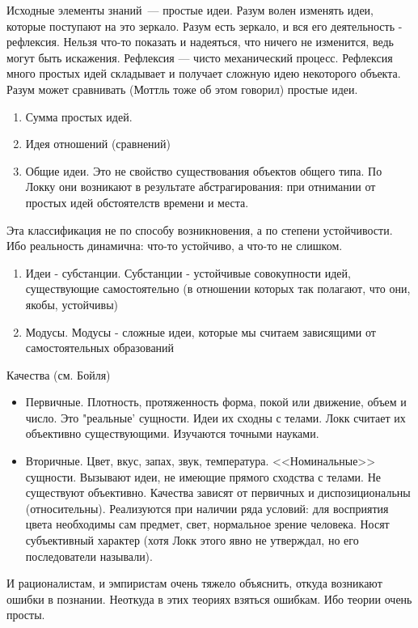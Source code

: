 Исходные элементы знаний~--- простые идеи. Разум волен изменять идеи, которые поступают
на это зеркало. Разум есть зеркало, и вся его деятельность - рефлексия. Нельзя что-то показать и надеяться, что ничего не изменится, ведь могут быть искажения. Рефлексия --- чисто механический процесс. Рефлексия много простых идей складывает и получает сложную идею некоторого объекта. Разум может сравнивать (Моттль тоже об этом говорил) простые идеи.
\begin{enumerate}
	\item Сумма простых идей.
	\item Идея отношений (сравнений)
	\item Общие идеи. Это не свойство существования объектов общего типа. По Локку они возникают в результате абстрагирования: при отнимании от простых идей обстоятелств времени и места.
\end{enumerate}
	
Эта классификация не по способу возникновения, а по степени устойчивости. Ибо реальность динамична: что-то устойчиво, а что-то не слишком.
\begin{enumerate}
	\item Идеи - субстанции. Субстанции - устойчивые совокупности идей, существующие самостоятельно (в отношении которых так полагают, что они, якобы, устойчивы)
	\item Модусы. Модусы - сложные идеи, которые мы считаем зависящими от самостоятельных образований
\end{enumerate}
	
Качества (см. Бойля)
\begin{itemize}
 	\item Первичные. Плотность, протяженность форма, покой или движение, объем и число. Это "реальные' сущности. Идеи их сходны с телами. Локк считает их объективно существующими. Изучаются точными науками.
	\item Вторичные. Цвет, вкус, запах, звук, температура. <<Номинальные>> сущности. Вызывают идеи, не имеющие прямого сходства с телами. Не существуют объективно. Качества зависят от первичных и диспозициональны (относительны). Реализуются при наличии ряда условий: для восприятия цвета необходимы сам предмет, свет, нормальное зрение человека. Носят субъективный характер (хотя Локк этого явно не утверждал, но его последователи называли).
\end{itemize} 

И рационалистам, и эмпиристам очень тяжело объяснить, откуда возникают ошибки в познании. Неоткуда в этих теориях взяться ошибкам. Ибо теории очень просты.

